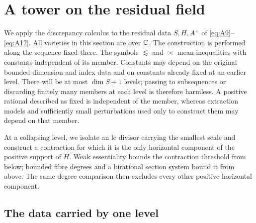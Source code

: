 \section{A tower on the residual field}\label{b:scale-tower}

We apply the discrepancy calculus to the residual data
$S,H,A^+$ of \eqref{eq:A9}--\eqref{eq:A12}.  All varieties in this
section are over $\mathbb C$.  The construction is performed along the
sequence fixed there.  The symbols $\lesssim$ and $\asymp$ mean inequalities
with constants independent of its member.  Constants may depend on the
original bounded dimension and index data and on constants already fixed
at an earlier level.  There will be at most $\dim S+1$ levels; passing to
subsequences or discarding finitely many members at each level is therefore
harmless.  A positive rational described as fixed is independent of the
member, whereas extraction models and sufficiently small perturbations
used only to construct them may depend on that member.

At a collapsing level, we isolate an lc divisor carrying the smallest
scale and construct a contraction for which it is the only horizontal
component of the positive support of $H$. Weak essentiality bounds the
contraction threshold from below; bounded fibre degrees and a birational
section system bound it from above. The same degree comparison then
excludes every other positive horizontal component.

\subsection{The data carried by one level}

